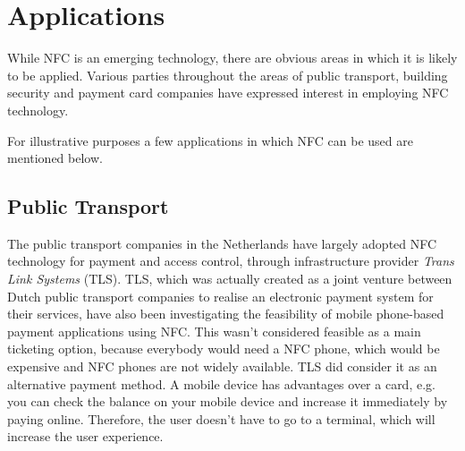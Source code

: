 \section{Applications}
While NFC is an emerging technology, there are obvious areas in which it is likely to be applied.
Various parties throughout the areas of public transport, building security and payment card companies have expressed interest in employing NFC technology.

For illustrative purposes a few applications in which NFC can be used are mentioned below.

\subsection{Public Transport}
The public transport companies in the Netherlands have largely adopted NFC technology for payment and access control, through infrastructure provider \textit{Trans Link Systems} (TLS).
TLS, which was actually created as a joint venture between Dutch public transport companies to realise an electronic payment system for their services, have also been investigating the feasibility of mobile phone-based payment applications using NFC. This wasn't considered feasible as a main ticketing option, because everybody would need a NFC phone, which would be expensive and NFC phones are not widely available. TLS did consider it as an alternative payment method. \cite{OVchipkaart} %
A mobile device has advantages over a card, e.g. you can check the balance on your mobile device and increase it immediately by paying online. Therefore, the user doesn't have to go to a terminal, which will increase the user experience.




